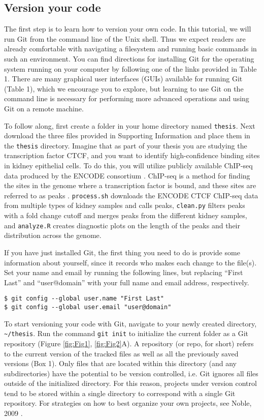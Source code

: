 \subsection*{Version your code}

The first step is to learn how to version your own code.
In this tutorial, we will run Git from the command line of the Unix shell.
Thus we expect readers are already comfortable with navigating a filesystem and running basic commands in such an environment.
You can find directions for installing Git for the operating system running on your computer by following one of the links provided in Table 1.
There are many graphical user interfaces (GUIs) available for running Git (Table 1), which we encourage you to explore, but learning to use Git on the command line is necessary for performing more advanced operations and using Git on a remote machine.

To follow along, first create a folder in your home directory named \verb|thesis|.
Next download the three files provided in Supporting Information and place them in the \verb|thesis| directory.
Imagine that as part of your thesis you are studying the transcription factor CTCF, and you want to identify high-confidence binding sites in kidney epithelial cells.
To do this, you will utilize publicly available ChIP-seq data produced by the ENCODE consortium \cite{22955616}.
ChIP-seq is a method for finding the sites in the genome where a transcription factor is bound, and these sites are referred to as peaks \cite{24244136}.
\verb|process.sh| downloads the ENCODE CTCF ChIP-seq data from multiple types of kidney samples and calls peaks,
\verb|clean.py| filters peaks with a fold change cutoff and merges peaks from the different kidney samples,
and \verb|analyze.R| creates diagnostic plots on the length of the peaks and their distribution across the genome.

If you have just installed Git, the first thing you need to do is provide some information about yourself, since it records who makes each change to the file(s).
Set your name and email by running the following lines, but replacing ``First Last'' and ``user@domain'' with your full name and email address, respectively.

\begin{verbatim}
$ git config --global user.name "First Last"
$ git config --global user.email "user@domain"
\end{verbatim}

To start versioning your code with Git, navigate to your newly created directory, \verb|~/thesis|.
Run the command \verb|git init| to initialize the current folder as a Git repository (Figure \ref{fig:Fig1}, \ref{fig:Fig2}A).
A repository (or repo, for short) refers to the current version of the tracked files as well as all the previously saved versions (Box 1).
Only files that are located within this directory (and any subdirectories) have the potential to be version controlled,
i.e. Git ignores all files outside of the initialized directory.
For this reason, projects under version control tend to be stored within a single directory to correspond with a single Git repository.
For strategies on how to best organize your own projects, see Noble, 2009 \cite{19649301}.

